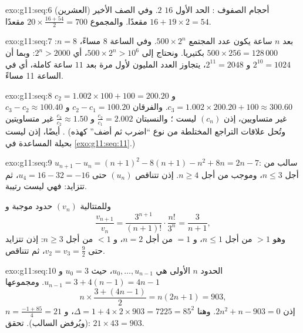 \begin{solution}{exo:g11:seq:6}
أحجام الصفوف : الحد الأول $16$  $2$. وفي الصف
الأخير (العشرين) $16 + 19 \times 2 = 54$ مقعدًا. والمجموع
$20 \times \frac{16 + 54}{2} = 700$ مقعدًا.
\end{solution}

\begin{solution}{exo:g11:seq:7}
بعد $n$ ساعة يكون عدد المجتمع $500 \times 2^n$. وفي الساعة 8 مساءً، $n = 8$:
$500 \times 256 = 128\,000$ بكتيريا. ونحتاج إلى $500 \times 2^n >
10^6$، أي $2^n > 2000$: وبما أن $2^{10} = 1024$ و $2^{11} = 2048$، يتجاوز
العدد المليون لأول مرة بعد $11$ ساعة كاملة، أي في الساعة 11 مساءً.
\end{solution}

\begin{solution}{exo:g11:seq:8}
$c_2 = 1.002 \times 100 + 100 = 200.20$ و
$c_3 = 1.002 \times 200.20 + 100 \approx 300.60$. والفرقان
$c_2 - c_1 = 100.20$ و $c_3 - c_2 \approx 100.40$ غير متساويين، إذن
$(c_n)$ ليست ؛ والنسبتان $\frac{c_2}{c_1} = 2.002$ و
$\frac{c_3}{c_2} \approx 1.50$ غير متساويتين أيضًا، إذن ليست
. (وتُحل علاقات التراجع المختلطة من نوع ``اضرب ثم أضف'' كهذه
بحيلة  المساعدة في \cref{exo:g11:seq:11}.)
\end{solution}

\begin{solution}{exo:g11:seq:9}
$u_{n+1} - u_n = (n+1)^2 - 8(n+1) - n^2 + 8n = 2n - 7$: سالب من أجل
$n \leq 3$، وموجب من أجل $n \geq 4$. إذن تتناقص $(u_n)$ حتى
$u_4 = 16 - 32 = -16$، ثم تتزايد: فهي ليست رتيبة.

وللمتتالية $(v_n)$ حدود موجبة و
\[
\frac{v_{n+1}}{v_n} = \frac{3^{n+1}}{(n+1)!} \cdot \frac{n!}{3^n}
= \frac{3}{n+1},
\]
وهو $> 1$ من أجل $n \leq 1$، و $= 1$ من أجل $n = 2$، و $< 1$ من أجل
$n \geq 3$: إذن تتزايد  حتى $v_2 = v_3 = \frac92$، ثم
تتناقص.
\end{solution}

\begin{solution}{exo:g11:seq:10}
الحدود $n$ الأولى هي $u_0, \dots, u_{n-1}$، حيث $u_0 = 3$ و
$u_{n-1} = 3 + 4(n-1) = 4n - 1$. ومجموعها
\[
n \times \frac{3 + (4n-1)}{2} = n(2n + 1) = 903,
\]
إذن $2n^2 + n - 903 = 0$. وهنا $\Delta = 1 + 4 \times 2 \times 903 =
7225 = 85^2$، و $n = \frac{-1 + 85}{4} = 21$ (ويُرفض  السالب).
تحقق: $21 \times 43 = 903$.
\end{solution}

